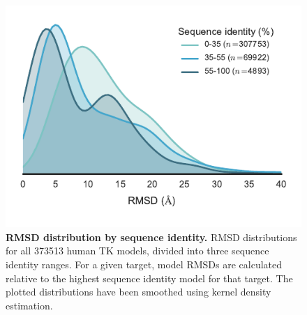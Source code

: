 \documentclass[aps,pre,twocolumn,nofootinbib,superscriptaddress,linenumbers]{revtex4-1}
\begin{document}
\begin{figure}[tb]
    \includegraphics[width=1.0\columnwidth]{rmsddist/rmsddist2.pdf}

    \caption{{\bf RMSD distribution by sequence identity.}
    RMSD distributions for all \num{373513} human TK models, divided into three sequence identity ranges.
    For a given target, model RMSDs are calculated relative to the highest sequence identity model for that target.
    The plotted distributions have been smoothed using kernel density estimation.
  }
  \label{figure:rmsd-distribution-by-sequence-identity}
\end{figure}

\end{document}
